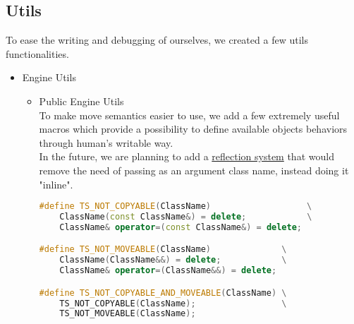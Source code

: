 \newpage
\subsection{Utils}
To ease the writing and debugging of ourselves, we created a few utils functionalities.

\begin{itemize}
    \item Engine Utils
    \begin{itemize}
        \item Public Engine Utils\\
        To make move semantics easier to use, we add a few extremely useful macros which provide a possibility to define available objects behaviors through human's writable way.\\
        In the future, we are planning to add a \hyperref[sec:refl]{reflection system} that would remove the need of passing as an argument class name, instead doing it "inline".\\
        
\begin{lstlisting}[language=c++, caption=Macros of Public Engine Utils(./engine/include/tsengine/utils.hpp)]
#define TS_NOT_COPYABLE(ClassName)                   \
    ClassName(const ClassName&) = delete;            \
    ClassName& operator=(const ClassName&) = delete;

#define TS_NOT_MOVEABLE(ClassName)              \
    ClassName(ClassName&&) = delete;            \
    ClassName& operator=(ClassName&&) = delete;

#define TS_NOT_COPYABLE_AND_MOVEABLE(ClassName) \
    TS_NOT_COPYABLE(ClassName);                 \
    TS_NOT_MOVEABLE(ClassName);


\end{lstlisting}
\end{itemize}
\end{itemize}
